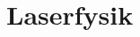 \documentclass[crop=false, class=memoir]{standalone}
\begin{document}
\section{Laserfysik}
\end{document}
